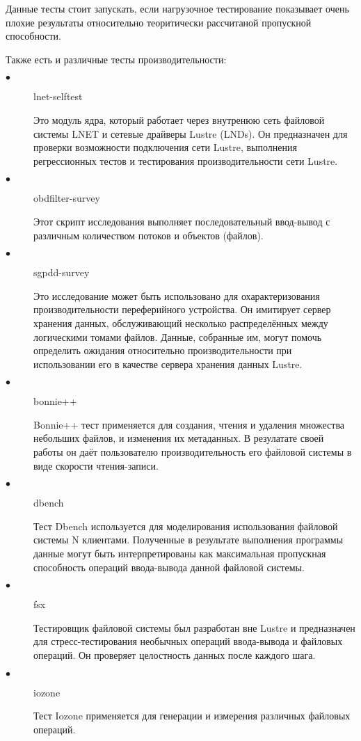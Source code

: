 Данные тесты стоит запускать, если нагрузочное тестирование показывает очень плохие результаты относительно теоритически рассчитаной пропускной способности.

Также есть и различные тесты производительности: ~ \cite{lustre_tests}
\begin{description}
    \item[$\bullet$] lnet-selftest
    
    Это модуль ядра, который работает через внутренюю сеть файловой системы LNET и сетевые драйверы Lustre (LNDs). Он предназначен для проверки возможности подключения сети Lustre, выполнения
    регрессионных тестов и тестирования производительности сети Lustre.
    \item[$\bullet$] obdfilter-survey
    
    Этот скрипт исследования выполняет последовательный ввод-вывод с различным
    количеством потоков и объектов (файлов).
    \item[$\bullet$] sgpdd-survey
    
    Это исследование может быть использовано для охарактеризования производительности переферийного
    устройства. Он имитирует сервер хранения данных, обслуживающий несколько распределённых между
    логическими томами файлов. Данные, собранные им, могут помочь определить ожидания относительно
    производительности при использовании его в качестве сервера хранения данных Lustre.
    \item[$\bullet$] bonnie++
    
    Bonnie++ тест применяется для создания, чтения и удаления множества небольших файлов, и изменения их метаданных. В резулатате своей работы он даёт пользователю производительность его файловой системы в виде скорости чтения-записи.
    \item[$\bullet$] dbench
    
    Тест Dbench используется для моделирования использования файловой системы N клиентами. Полученные в результате выполнения программы данные могут быть интерпретированы как максимальная пропускная способность операций ввода-вывода данной файловой системы.

    \item[$\bullet$] fsx
    
    Тестировщик файловой системы был разработан вне Lustre и предназначен для
    стресс-тестирования необычных операций ввода-вывода и файловых операций.
    Он проверяет целостность данных после каждого шага. 
    \item[$\bullet$] iozone
    
    Тест Iozone применяется для генерации и измерения различных файловых операций.
    
\end{description}

